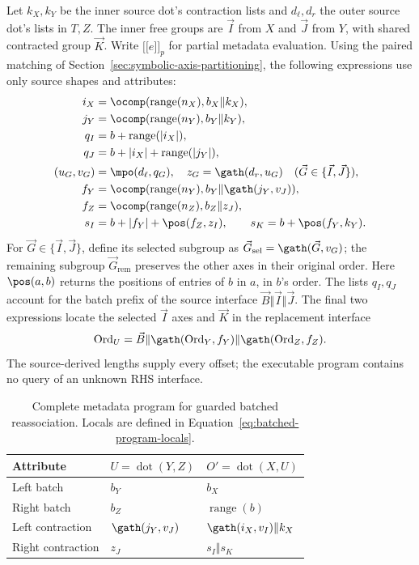 Let $k_X,k_Y$ be the inner source dot's contraction lists and
$d_\ell,d_r$ the outer source dot's lists in $T,Z$. The inner free groups
are $\vec I$ from $X$ and $\vec J$ from $Y$, with shared contracted group
$\vec K$. Write $\lbrack\!\lbrack e\rbrack\!\rbrack_p$ for partial metadata
evaluation. Using the paired matching of
Section~\ref{sec:symbolic-axis-partitioning}, the following expressions
use only source shapes and attributes:
\begin{equation}
\begin{aligned}
 i_X&=\ocomp(\operatorname{range}(n_X),b_X\Vert k_X),\\
 j_Y&=\ocomp(\operatorname{range}(n_Y),b_Y\Vert k_Y),\\
 q_I&=b+\operatorname{range}(|i_X|),\\
 q_J&=b+|i_X|+\operatorname{range}(|j_Y|),\\
 (u_G,v_G)&=\mpo(d_\ell,q_G),\quad z_G=\gath(d_r,u_G)
                 \quad(\vec G\in\{\vec I,\vec J\}),\\
 f_Y&=\ocomp(\operatorname{range}(n_Y),
                      b_Y\Vert\gath(j_Y,v_J)),\\
 f_Z&=\ocomp(\operatorname{range}(n_Z),b_Z\Vert z_J),\\
 s_I&=b+|f_Y|+\pos(f_Z,z_I),\qquad
 s_K=b+\pos(f_Y,k_Y).
\end{aligned}
\label{eq:batched-program-locals}
\end{equation}
For $\vec G\in\{\vec I,\vec J\}$, define its selected subgroup as
$\vec G_{\mathrm{sel}}=\gath(\vec G,v_G)$; the remaining subgroup
$\vec G_{\mathrm{rem}}$ preserves the other axes in their original order.
Here $\pos(a,b)$ returns the positions of entries of $b$ in $a$, in
$b$'s order. The lists $q_I,q_J$ account for the batch prefix of the source interface
$\vec B\Vert \vec I\Vert \vec J$. The final two expressions locate the selected $\vec I$
axes and $\vec K$ in the replacement interface
\begin{equation}
 \operatorname{Ord}_U=\vec B\Vert\gath(\operatorname{Ord}_Y,f_Y)
                  \Vert\gath(\operatorname{Ord}_Z,f_Z).
 \label{eq:batched-u-interface}
\end{equation}
The source-derived lengths supply every offset; the executable program
contains no query of an unknown RHS interface.

\begin{table}[!htbp]
\caption{Complete metadata program for guarded batched reassociation.
Locals are defined in Equation~\eqref{eq:batched-program-locals}.}
\label{tab:reassociation-program}
\small
\begin{tabularx}{\linewidth}{@{}lYY@{}}\toprule
Attribute & $U=\operatorname{dot}(Y,Z)$ & $O'=\operatorname{dot}(X,U)$\\\midrule
Left batch & $b_Y$ & $b_X$\\
Right batch & $b_Z$ & $\operatorname{range}(b)$\\
Left contraction & $\gath(j_Y,v_J)$ & $\gath(i_X,v_I)\Vert k_X$\\
Right contraction & $z_J$ & $s_I\Vert s_K$\\\bottomrule
\end{tabularx}
\end{table}

